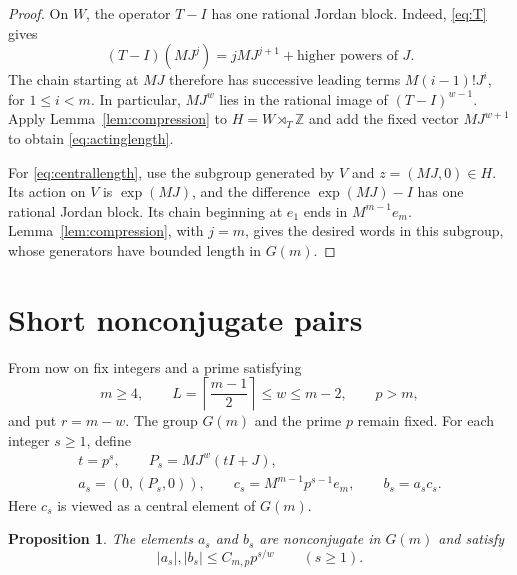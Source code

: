 \documentclass[11pt,letterpaper]{amsart}
\numberwithin{equation}{section}
\newtheorem{proposition}[theorem]{Proposition}
\theoremstyle{remark}
\newcommand{\Z}{\mathbb Z}
\begin{document}
\begin{proof}
On $W$, the operator $T-I$ has one rational Jordan block. Indeed,
\eqref{eq:T} gives
\[
 (T-I)(MJ^j)=jMJ^{j+1}+\text{higher powers of }J.
\]
The chain starting at $MJ$ therefore has successive leading terms
$M(i-1)!J^i$, for $1\le i<m$. In particular, $MJ^w$ lies in the
rational image of $(T-I)^{w-1}$. Apply Lemma~\ref{lem:compression}
to $H=W\rtimes_T\Z$ and add the fixed vector $MJ^{w+1}$ to obtain
\eqref{eq:actinglength}.

For \eqref{eq:centrallength}, use the subgroup generated by $V$ and
$z=(MJ,0)\in H$. Its action on $V$ is $\exp(MJ)$, and the difference
$\exp(MJ)-I$ has one rational Jordan block. Its chain beginning at
$e_1$ ends in $M^{m-1}e_m$. Lemma~\ref{lem:compression}, with $j=m$,
gives the desired words in this subgroup, whose generators have bounded
length in $G(m)$.
\end{proof}

\section{Short nonconjugate pairs}\label{sec:pairs}

From now on fix integers and a prime satisfying
\begin{equation}\label{eq:parameters}
 m\ge4,\qquad
 L=\left\lceil\frac{m-1}{2}\right\rceil\le w\le m-2,
 \qquad p>m,
\end{equation}
and put $r=m-w$. The group $G(m)$ and the prime $p$ remain fixed.
For each integer $s\ge1$, define
\begin{equation}\label{eq:pairs}
 \begin{gathered}
 t=p^s,\qquad P_s=MJ^w(tI+J),\\
 a_s=(0,(P_s,0)),\qquad c_s=M^{m-1}p^{s-1}e_m,\qquad
 b_s=a_sc_s.
 \end{gathered}
\end{equation}
Here $c_s$ is viewed as a central element of $G(m)$.

\begin{proposition}\label{prop:pairs}
The elements $a_s$ and $b_s$ are nonconjugate in $G(m)$ and satisfy
\begin{equation}\label{eq:pairlength}
 |a_s|,|b_s|\le C_{m,p}p^{s/w}\qquad(s\ge1).
\end{equation}
\end{proposition}
\end{document}
